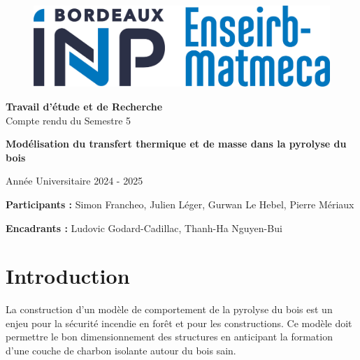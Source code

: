 \documentclass[a4paper,11pt]{article}
\begin{document}
\begin{titlepage}
    \begin{figure}
        \includegraphics[width=0.4\linewidth]{images/logo_em.jpg}
    \end{figure}
    \begin{center}
        \vspace*{3.5cm}


        \huge \textbf{Travail d'étude et de Recherche} \\
        Compte rendu du Semestre 5
        \vspace{1cm}

        \hrulefill
        
        \vspace{0.4cm}
        {\Huge \textbf{Modélisation du transfert thermique et de masse dans la pyrolyse du bois}} \\
        \vspace{0.25cm}
        \hrulefill
        
        \vspace{7cm}

        \Large Année Universitaire 2024 - 2025
        
        \vspace{2cm}
        
        \normalsize
        \textbf{Participants :}
        Simon Francheo, Julien Léger, Gurwan Le Hebel, Pierre Mériaux

        \textbf{Encadrants :}
        Ludovic Godard-Cadillac, Thanh-Ha Nguyen-Bui 

        \vfill
        
    \end{center}
\end{titlepage}

\newpage
\tableofcontents
\newpage

\pagestyle{fancy}
\fancyhead{}


\section{Introduction}
La construction d'un modèle de comportement de la pyrolyse du bois est un enjeu pour la sécurité incendie en forêt et pour les constructions. Ce modèle doit permettre le bon dimensionnement des structures en anticipant la formation d'une couche de charbon isolante autour du bois sain. 
\\
\end{document}
